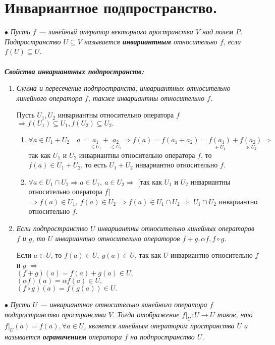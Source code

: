 \section{Инвариантное подпространство.}
$\bullet$ \textit{Пусть $f$ --- линейный оператор векторного пространства $V$ над полем $P$. Подпространство $U\subseteq V$ называется \textbf{инвариантным} относительно $f$, если $f(U)\subseteq U$.}\\\\
\textit{\textbf{Свойства инвариантных подпространств:}}
\begin{enumerate}
	\item \textit{Сумма и пересечение подпространств, инвариантных относительно линейного оператора $f$, также инвариантны относительно $f$.}\begin{Proof} Пусть $U_1, U_2$ инвариантны относительно оператора $f$ $\Rightarrow f(U_1) \subseteq U_1, f(U_2) \subseteq U_2.$\begin{enumerate}
			\item $\forall a \in U_1 + U_2\quad a = \underset{\in U_1}{a_1} + \underset{\in U_2}{a_2}\Rightarrow f(a) = f(a_1 + a_2) = \underset{\in U_1}{f(a_1)} + \underset{\in U_2}{f(a_2)} \Rightarrow$ так как $U_1$ и $U_2$ инвариантны относительно оператора $f$, то $f(a) \in U_1 + U_2$, то есть $U_1 + U_2$ инвариантно относительно $f$.
			\item $\forall a \in U_1 \cap U_2 \Rightarrow a\in U_1,\ a \in U_2 \Rightarrow$ $[$так как $U_1$ и $U_2$ инвариантны относительно оператора $f]$ $\Rightarrow f(a) \in U_1, \ f(a) \in U_2 \ \Rightarrow f(a) \in U_1\cap U_2 \Rightarrow$ $U_1\cap U_2$ инвариантно относительно $f$.
		\end{enumerate}
	\end{Proof}
	\item \textit{Если подпространство $U$ инвариантны относительно линейных операторов $f$ и $g$, то $U$ инвариантно относительно операторов $f + g, \alpha f, f \circ g$.}\begin{Proof} Если
		$a \in U$, то $f(a) \in U, \ g(a) \in U$, так как $U$ инвариантно относительно $f$ и $g$ $\Rightarrow$\\
		$(f + g)(a) = f(a) + g(a) \in U,$\\
		$(\alpha f)(a) = \alpha f(a)\in U,$\\
		$(f \circ g)(a) = f(g(a)) \in U.$
	\end{Proof}
\end{enumerate}
$\bullet$ \textit{Пусть $U$ --- инвариантное относительно линейного оператора $f$ подпространство пространства $V$. Тогда отображение $f|_U : U\rightarrow U$ такое, что $f|_U(a) = f(a), \forall a \in U$, является линейным оператором пространства $U$ и называется \textbf{ограничением} оператора $f$ на подпространство $U$.}
